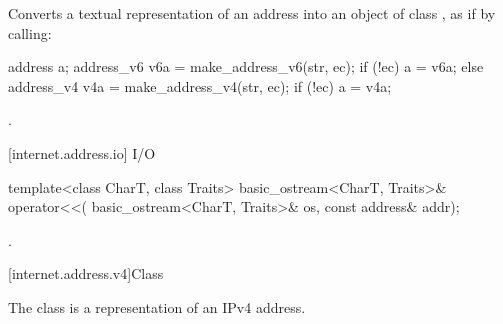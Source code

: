 \begin{itemdescr}
\pnum
\effects Converts a textual representation of an address into an object of class , as if by calling: 
\begin{codeblock}
address a;
address_v6 v6a = make_address_v6(str, ec);
if (!ec)
  a = v6a;
else
{
  address_v4 v4a = make_address_v4(str, ec);
  if (!ec)
    a = v4a;
}
\end{codeblock}


\pnum
\returns {}.
\end{itemdescr}



[internet.address.io]{ I/O}

\begin{itemdecl}
template<class CharT, class Traits>
  basic_ostream<CharT, Traits>& operator<<(
    basic_ostream<CharT, Traits>& os, const address& addr);
\end{itemdecl}

\begin{itemdescr}
\pnum
\returns {}.
\end{itemdescr}




[internet.address.v4]{Class }

\pnum
The class  is a representation of an IPv4 address.

